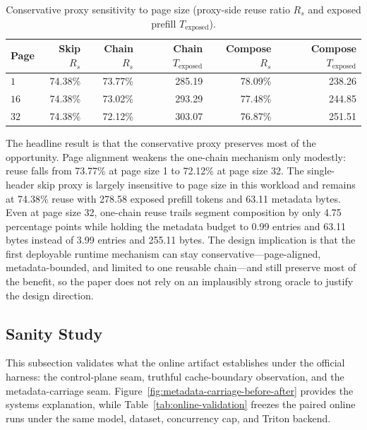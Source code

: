 \documentclass[conference]{IEEEtran}
\begin{document}
\begin{table}[t]
\caption{Conservative proxy sensitivity to page size (proxy-side reuse ratio $R_s$ and exposed prefill $T_{\text{exposed}}$).}
\label{tab:runtime-proxy}
\centering
\footnotesize
\setlength{\tabcolsep}{2.5pt}
\begin{tabular}{@{}lrrrrr@{}}
\toprule
Page & \shortstack{Skip\\$R_s$} & \shortstack{Chain\\$R_s$} & \shortstack{Chain\\$T_{\text{exposed}}$} & \shortstack{Compose\\$R_s$} & \shortstack{Compose\\$T_{\text{exposed}}$} \\
\midrule
$1$ & 74.38\% & 73.77\% & 285.19 & 78.09\% & 238.26 \\
$16$ & 74.38\% & 73.02\% & 293.29 & 77.48\% & 244.85 \\
$32$ & 74.38\% & 72.12\% & 303.07 & 76.87\% & 251.51 \\
\bottomrule
\end{tabular}
\end{table}

The headline result is that the conservative proxy preserves most of the opportunity. Page alignment weakens the one-chain mechanism only modestly: reuse falls from 73.77\% at page size 1 to 72.12\% at page size 32. The single-header skip proxy is largely insensitive to page size in this workload and remains at 74.38\% reuse with 278.58 exposed prefill tokens and 63.11 metadata bytes. Even at page size 32, one-chain reuse trails segment composition by only 4.75 percentage points while holding the metadata budget to 0.99 entries and 63.11 bytes instead of 3.99 entries and 255.11 bytes. The design implication is that the first deployable runtime mechanism can stay conservative---page-aligned, metadata-bounded, and limited to one reusable chain---and still preserve most of the benefit, so the paper does not rely on an implausibly strong oracle to justify the design direction.

\subsection{Sanity Study}

This subsection validates what the online artifact establishes under the official harness: the control-plane seam, truthful cache-boundary observation, and the metadata-carriage seam. Figure~\ref{fig:metadata-carriage-before-after} provides the systems explanation, while Table~\ref{tab:online-validation} freezes the paired online runs under the same model, dataset, concurrency cap, and Triton backend.
\end{document}
